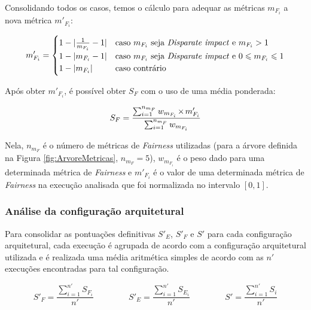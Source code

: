\documentclass[Portugues,Final]{ic-tese-v3}
\let\oldtimes\times
\def\times{{\mkern1mu\oldtimes\mkern1mu}}
\begin{document}
Consolidando todos os casos, temos o cálculo para adequar as métricas $m_{F_i}$ a nova métrica $m'_{F_i}$:

\begin{equation}
\label{eqn:normalizationFairnessStep3}
	\begin{aligned}
	m'_{F_i} = 
	\begin{cases}
	1-\lvert \frac{1}{m_{F_i}}-1 \lvert & \text{caso $m_{F_i}$ seja \textit{Disparate impact} e $m_{F_i} > 1$}\\
	1-\lvert m_{F_i}-1 \lvert & \text{caso $m_{F_i}$ seja \textit{Disparate impact} e $0 \leqslant m_{F_i} \leqslant 1$}\\
	1-\lvert m_{F_i} \rvert & \text{caso contrário}
	\end{cases}
	\end{aligned}
\end{equation}

Após obter $m'_{F_i}$, é possível obter $S_F$ com o uso de uma média ponderada:

\begin{equation}
\label{eqn:FairnessScore}
	\begin{aligned}
	S_{F} = \frac{\sum_{i=1}^{n_{m_F}} w_{m_{F_i}} \times m'_{F_{i}}}{\sum_{i=1}^{n_{m_F}} w_{m_{F_i}}}
	\end{aligned}
\end{equation}

Nela, $n_{m_F}$ é o número de métricas de \textit{Fairness} utilizadas (para a árvore definida na Figura \ref{fig:ArvoreMetricas}, $n_{m_F} = 5$), $w_{m_{F_i}}$ é o peso dado para uma determinada métrica de \textit{Fairness} e $m'_{F_{i}}$ é o valor de uma determinada métrica de \textit{Fairness} na execução analisada que foi normalizada no intervalo $\left[0,1 \right]$. 

\subsubsection{Análise da configuração arquitetural}

Para consolidar as pontuações definitivas $S'_E$, $S'_F$ e $S'$ para cada configuração arquitetural, cada execução é agrupada de acordo com a configuração arquitetural utilizada e é realizada uma média aritmética simples de acordo com as $n'$ execuções encontradas para tal configuração.

\begin{equation}
\label{eqn:configScores}
	S'_F = \frac{\sum_{i=1}^{n'} S_{F_i}}{n'}\;\;\;\;\;\;\;\;\;\;\;\;\;\;\;
	S'_E = \frac{\sum_{i=1}^{n'} S_{E_i}}{n'}\;\;\;\;\;\;\;\;\;\;\;\;\;\;\;
	S' = \frac{\sum_{i=1}^{n'} S_i}{n'}
\end{equation}
\end{document}
